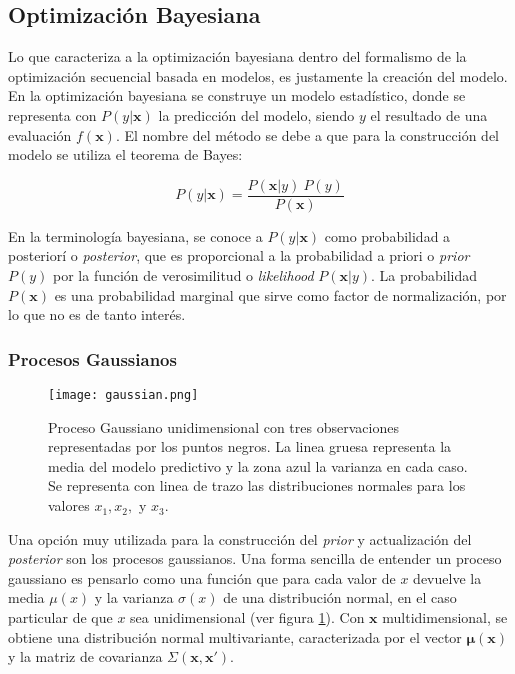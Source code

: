 \subsection*{Optimización Bayesiana}

Lo que caracteriza a la optimización bayesiana dentro del formalismo de la optimización secuencial basada en modelos, es justamente la creación del modelo.
En la optimización bayesiana se construye un modelo estadístico, donde se representa con  $P(y|\textbf{x})$ la predicción del modelo, siendo $y$ el resultado de una evaluación $f(\textbf{x})$. El nombre del método se debe a que para la construcción del modelo se utiliza el teorema de Bayes:
  
 \[
 P(y|\textbf{x}) = \frac{P(\textbf{x}|y) \ P(y)}{P(\textbf{x})}
 \]
 
 En la terminología bayesiana, se conoce a $P(y|\textbf{x})$ como probabilidad a posteriorí o \textit{posterior}, que es proporcional a la probabilidad a priori o \textit{prior} $P(y)$ por la función de verosimilitud o \textit{likelihood} $P(\textbf{x}|y)$. La probabilidad $P(\textbf{x})$ es una probabilidad marginal que sirve como factor de normalización, por lo que no es de tanto interés.


\subsubsection*{Procesos Gaussianos}

\begin{figure}[h!]
\centering
\texttt{[image: gaussian.png]}
\caption{Proceso Gaussiano unidimensional con tres observaciones representadas por los puntos negros. La linea gruesa representa la media del modelo predictivo y la zona azul la varianza en cada caso. Se representa con linea de trazo las distribuciones normales para los valores $x_1, x_2,$ y $x_3$\cite{https://doi.org/10.48550/arxiv.1012.2599}.}
\label{fig:gaussian}
\end{figure}

Una opción muy utilizada para la construcción del \textit{prior} y actualización del \textit{posterior} son los procesos gaussianos. Una forma sencilla de entender un proceso gaussiano es pensarlo como una función que para cada valor de $x$ devuelve la media $\mu(x)$ y la varianza $\sigma(x)$ de una distribución normal, en el caso particular de que $x$ sea unidimensional (ver figura \ref{fig:gaussian}). Con $\textbf{x}$ multidimensional, se obtiene una distribución normal multivariante, caracterizada por el vector $\bm{\mu}(\textbf{x})$ y la matriz de covarianza $\Sigma(\textbf{x}, \textbf{x}')$.

